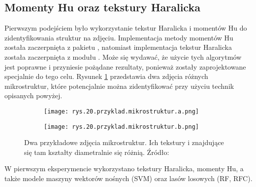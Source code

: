\subsection{Momenty Hu oraz tekstury Haralicka}
\label{sec:hu_haralick}

Pierwszym podejściem było wykorzystanie tekstur Haralicka i momentów Hu do zidentyfikowania struktur na zdjęciu. Implementacja metody momentów Hu została zaczerpnięta z pakietu , natomiast implementacja tekstur Haralicka została zaczerpnięta z modułu . Może się wydawać, że użycie tych algorytmów jest poprawne i przyniesie pożądane rezultaty, ponieważ zostały zaprojektowane specjalnie do tego celu. Rysunek \ref{fig:mesh20} przedstawia dwa zdjęcia różnych mikrostruktur, które potencjalnie można zidentyfikować przy użyciu technik opisanych powyżej.
\begin{figure}[h]
	\centering
	\begin{subfigure}{0.47\textwidth}
	    \centering
	    \texttt{[image: rys.20.przyklad.mikrostruktur.a.png]}
	\end{subfigure}
	\begin{subfigure}{0.47\textwidth}
	    \centering
	    \texttt{[image: rys.20.przyklad.mikrostruktur.b.png]}
	\end{subfigure}
	\caption{\label{fig:mesh20}Dwa przykładowe zdjęcia mikrostruktur. Ich tekstury i znajdujące się tam kształty diametralnie się różnią. Źródło: \cite{Pirowski17}}
\end{figure}
W pierwszym eksperymencie wykorzystano tekstury Haralicka, momenty Hu, a także modele maszyny wektorów nośnych (SVM) oraz lasów losowych (RF, RFC). 
